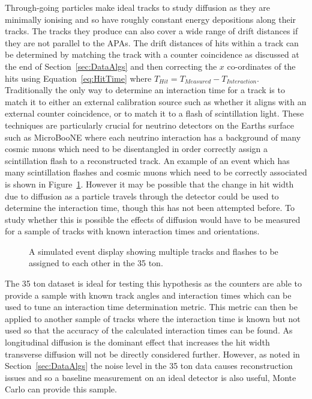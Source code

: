 Through-going particles make ideal tracks to study diffusion as they are minimally ionising and so have roughly constant energy depositions along their tracks. The tracks they produce can also cover a wide range of drift distances if they are not parallel to the APAs. The drift distances of hits within a track can be determined by matching the track with a counter coincidence as discussed at the end of Section~\ref{sec:DataAlgs} and then correcting the $x$ co-ordinates of the hits using Equation~\ref{eq:HitTime} where $T_{Hit} = T_{Measured} - T_{Interaction}$. \\

Traditionally the only way to determine an interaction time for a track is to match it to either an external calibration source such as whether it aligns with an external counter coincidence, or to match it to a flash of scintillation light. These techniques are particularly crucial for neutrino detectors on the Earths surface such as MicroBooNE where each neutrino interaction has a background of many cosmic muons which need to be disentangled in order correctly assign a scintillation flash to a reconstructed track. An example of an event which has many scintillation flashes and cosmic muons which need to be correctly associated is shown in Figure~\ref{fig:DiffLotsOfFlashes}. However it may be possible that the change in hit width due to diffusion as a particle travels through the detector could be used to determine the interaction time, though this has not been attempted before. To study whether this is possible the effects of diffusion would have to be measured for a sample of tracks with known interaction times and orientations. \\

\begin{figure}[h!]
  \centering
  \caption[A simulated event display showing multiple tracks and flashes in the 35 ton]
          {A simulated event display showing multiple tracks and flashes to be assigned to each other in the 35 ton.}
          \label{fig:DiffLotsOfFlashes}
\end{figure}

The 35 ton dataset is ideal for testing this hypothesis as the counters are able to provide a sample with known track angles and interaction times which can be used to tune an interaction time determination metric. This metric can then be applied to another sample of tracks where the interaction time is known but not used so that the accuracy of the calculated interaction times can be found. As longitudinal diffusion is the dominant effect that increases the hit width transverse diffusion will not be directly considered further. However, as noted in Section~\ref{sec:DataAlgs} the noise level in the 35 ton data causes reconstruction issues and so a baseline measurement on an ideal detector is also useful, Monte Carlo can provide this sample. \\

